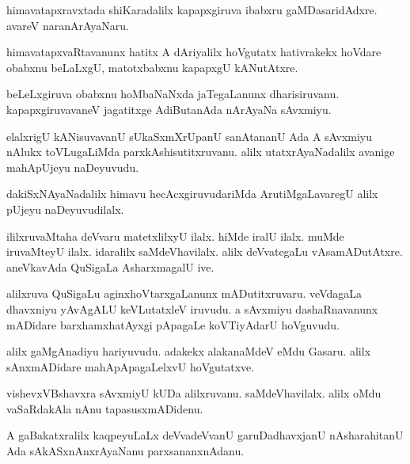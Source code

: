 \documentclass{article}
\begin{document}
\begin{mn}%
himavatapxravxtada shiKaradalilx kapapxgiruva ibabxru gaMDasaridAdxre. avareV naranArAyaNaru.
\end{mn}

\begin{mn}%
himavatapxvaRtavanunx hatitx A dAriyalilx hoVgutatx hativrakekx hoVdare obabxnu beLaLxgU, 
matotxbabxnu kapapxgU kANutAtxre.
\end{mn}

\begin{mn}%
beLeLxgiruva obabxnu hoMbaNaNxda jaTegaLanunx dharisiruvanu. kapapxgiruvavaneV jagatitxge 
AdiButanAda nArAyaNa sAvxmiyu.
\end{mn}

\begin{mn}%
elalxrigU kANisuvavanU sUkaSxmXrUpanU sanAtananU Ada A sAvxmiyu nAlukx toVLugaLiMda 
parxkAshisutitxruvanu. alilx utatxrAyaNadalilx avanige mahApUjeyu naDeyuvudu.
\end{mn}


\begin{mn}%
dakiSxNAyaNadalilx himavu hecAcxgiruvudariMda ArutiMgaLavaregU alilx pUjeyu naDeyuvudilalx.
\end{mn}

\begin{mn}%
ililxruvaMtaha deVvaru matetxlilxyU ilalx. hiMde iralU ilalx. muMde iruvaMteyU ilalx. 
idaralilx saMdeVhavilalx. alilx deVvategaLu vAsamADutAtxre. aneVkavAda QuSigaLa 
AsharxmagalU ive.
\end{mn}

\begin{mn}%
alilxruva QuSigaLu aginxhoVtarxgaLanunx mADutitxruvaru. veVdagaLa dhavxniyu yAvAgALU 
keVLutatxleV iruvudu. a sAvxmiyu dashaRnavanunx mADidare barxhamxhatAyxgi pApagaLe 
koVTiyAdarU hoVguvudu.
\end{mn}

\begin{mn}%
alilx gaMgAnadiyu hariyuvudu. adakekx alakanaMdeV eMdu Gasaru. alilx sAnxmADidare 
mahApApagaLelxvU hoVgutatxve.
\end{mn}

\begin{mn}%
vishevxVBshavxra sAvxmiyU kUDa alilxruvanu. saMdeVhavilalx. alilx oMdu vaSaRdakAla nAnu 
tapasusxmADidenu.
\end{mn}

\begin{mn}%
A gaBakatxralilx kaqpeyuLaLx deVvadeVvanU garuDadhavxjanU nAsharahitanU Ada 
sAkASxnAnxrAyaNanu parxsananxnAdanu.
\end{mn}
\end{document}
